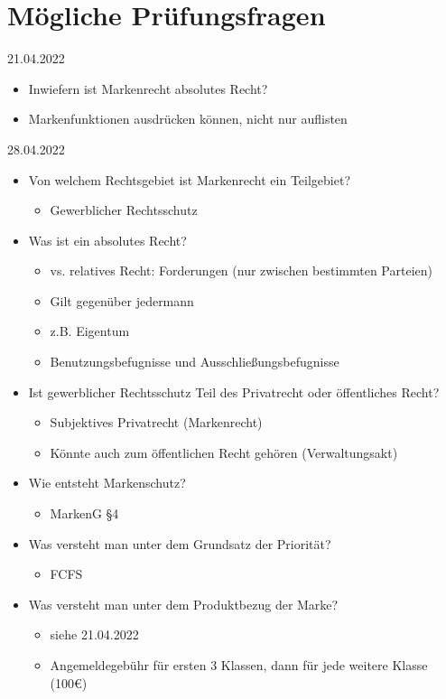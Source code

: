 \documentclass{report}
\begin{document}
\chapter{Mögliche Prüfungsfragen}
21.04.2022
\begin{itemize}
	\item Inwiefern ist Markenrecht absolutes Recht?
	\item Markenfunktionen ausdrücken können, nicht nur auflisten
\end{itemize}
28.04.2022
\begin{itemize}
	\item Von welchem Rechtsgebiet ist Markenrecht ein Teilgebiet?
	\begin{itemize}
		\item Gewerblicher Rechtsschutz
	\end{itemize}
	\item Was ist ein absolutes Recht?
	\begin{itemize}
		\item vs. relatives Recht: Forderungen (nur zwischen bestimmten Parteien)
		\item Gilt gegenüber jedermann
		\item z.B. Eigentum
		\item Benutzungsbefugnisse und Ausschließungsbefugnisse
	\end{itemize}
	\item Ist gewerblicher Rechtsschutz Teil des Privatrecht oder öffentliches Recht?
	\begin{itemize}
		\item Subjektives Privatrecht (Markenrecht)
		\item Könnte auch zum öffentlichen Recht gehören (Verwaltungsakt)
	\end{itemize}
	\item Wie entsteht Markenschutz?
	\begin{itemize}
		\item MarkenG §4
	\end{itemize}
	\item Was versteht man unter dem Grundsatz der Priorität?
	\begin{itemize}
		\item FCFS
	\end{itemize}
	\item Was versteht man unter dem Produktbezug der Marke?
	\begin{itemize}
		\item siehe 21.04.2022
		\item Angemeldegebühr für ersten 3 Klassen, dann für jede weitere Klasse (100€)
	\end{itemize}
\end{itemize}
\newpage
\end{document}
